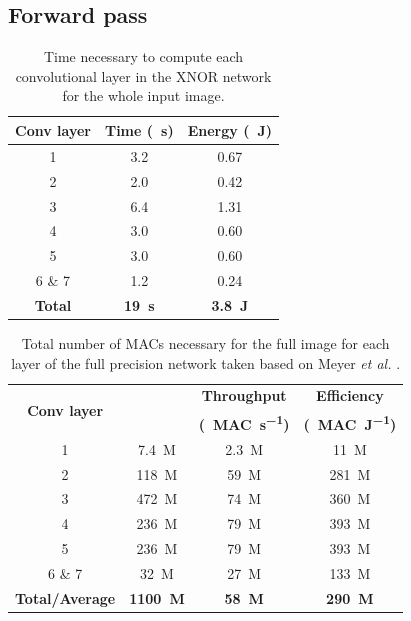 \documentclass[conference]{IEEEtran}
\begin{document}
\subsection{Forward pass}

\begin{table}[!t]
\renewcommand{\arraystretch}{1.3}
\caption{Time necessary to compute each convolutional layer in the XNOR network for the whole input image.}
\label{table:time}
\centering
\begin{tabular}{|c|c|c|}
\multicolumn{1}{c}{\bfseries Conv layer} & \multicolumn{1}{c}{\bfseries Time (\SI{}{\second})} & \multicolumn{1}{c}{\bfseries Energy (\SI{}{\joule})} \\
\hline
1 & \SI{3.2}{} & \SI{0.67}{}\\
\hline
2 & \SI{2.0}{} & \SI{0.42}{}\\
\hline
3 & \SI{6.4}{} & \SI{1.31}{}\\
\hline
4 & \SI{3.0}{} & \SI{0.60}{}\\
\hline
5 & \SI{3.0}{} & \SI{0.60}{}\\
\hline
6 \& 7 & \SI{1.2}{} & \SI{0.24}{}\\
\hline
\multicolumn{1}{c}{\bfseries Total} & \multicolumn{1}{c}{\bfseries \SI{19}{\second}} & \multicolumn{1}{c}{\bfseries \SI{3.8}{\joule}}\\
\end{tabular}
\end{table}

\begin{table}[!t]
\renewcommand{\arraystretch}{1.3}
\caption{Total number of MACs necessary for the full image for each layer of the full precision network taken based on Meyer \textit{et al.} \cite{lukas}.}
\label{table:mac}
\centering
\begin{tabular}{|c|c|c|c|}
\multicolumn{1}{c}{\multirow{2}{*}{\bfseries Conv layer}} & \multicolumn{1}{c}{\bfseries \multirow{2}{*}{MACs}} & \multicolumn{1}{c}{\bfseries Throughput} &  \multicolumn{1}{c}{\bfseries Efficiency}\\
\multicolumn{1}{c}{\quad} & \multicolumn{1}{c}{\quad} & \multicolumn{1}{c}{\bfseries (\SI{}{MAC\per\second})} &  \multicolumn{1}{c}{\bfseries (\SI{}{MAC\per J})}\\
\hline
1 & \SI{7.4}{M} & \SI{2.3}{M} & \SI{11}{M}\\
\hline
2 & \SI{118}{M} & \SI{59}{M} & \SI{281}{M}\\
\hline
3 & \SI{472}{M} & \SI{74}{M} & \SI{360}{M}\\
\hline
4 & \SI{236}{M} & \SI{79}{M} & \SI{393}{M}\\
\hline
5 & \SI{236}{M} & \SI{79}{M} & \SI{393}{M}\\
\hline
6 \& 7 & \SI{32}{M} & \SI{27}{M} & \SI{133}{M}\\
\hline
\multicolumn{1}{c}{\bfseries Total/Average} & \multicolumn{1}{c}{\bfseries \SI{1100}{M}} & \multicolumn{1}{c}{\bfseries \SI{58}{M}}& \multicolumn{1}{c}{\bfseries \SI{290}{M}}\\
\end{tabular}
\end{table}
\end{document}
